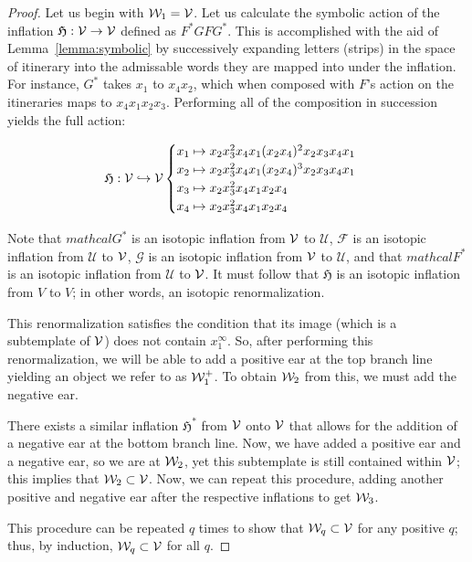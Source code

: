 \documentclass[paper.tex]{subfiles}
\begin{document}
\begin{proof}
Let us begin with $\mathcal{W}_1 = \mathcal{V}$. Let us calculate the symbolic action of the inflation $\mathfrak{H}: \mathcal{V} \to \mathcal{V}$ defined as $F^* G F G^*$. This is accomplished with the aid of Lemma~\ref{lemma:symbolic} by successively expanding
letters (strips) in the space of itinerary into the admissable words they are mapped into under the inflation.
For instance, $G^\ast$ takes $x_1$ to $x_4 x_2$, which when composed with $F$'s action on the itineraries maps to $x_4 x_1 x_2 x_3$. Performing all of the composition in succession yields the full action:

    $$\mathfrak{H}: \mathcal{V} \hookrightarrow \mathcal{V} \begin{cases}
        x_1 \mapsto x_2 x_3^2 x_4 x_1 (x_2 x_4)^2 x_2 x_3 x_4 x_1 \\
        x_2 \mapsto x_2 x_3^2 x_4 x_1 (x_2 x_4)^3 x_2 x_3 x_4 x_1 \\
        x_3 \mapsto x_2 x_3^2 x_4 x_1  x_2 x_4  \\
        x_4 \mapsto x_2 x_3^2 x_4 x_1  x_2 x_4  \end{cases} $$

        Note that $mathcal{G}^*$ is an isotopic inflation from $\mathcal{V}$ to $\mathcal{U}$, $\mathcal{F}$ is an isotopic inflation from $\mathcal{U}$ to $\mathcal{V}$, $\mathcal{G}$ is an isotopic inflation from $\mathcal{V}$ to $\mathcal{U}$, and that $mathcal{F}^*$ is an isotopic inflation from $\mathcal{U}$ to $\mathcal{V}$. It must follow that $\mathfrak{H}$ is an isotopic inflation from $V$ to $V$; in other words, an isotopic renormalization.

        This renormalization satisfies the condition that its image (which is a subtemplate of $\mathcal{V}$) does not contain $x_1^\infty$. So, after performing this renormalization, we will be able to add a positive ear at the top branch line
        yielding an object we refer to as $\mathcal{W}_1^+$. To obtain $\mathcal{W}_2$ from this, we must add the negative ear.

        There exists a similar inflation $\mathfrak{H}^*$ from $\mathcal{V}$ onto $\mathcal{V}$ that allows for the addition of a negative ear at the bottom branch line. Now, we have added a positive ear and a negative ear, so we are at $\mathcal{W}_2$, yet this subtemplate is still contained within $\mathcal{V}$; this implies that $\mathcal{W}_2 \subset \mathcal{V}$. Now, we can repeat this procedure, adding another positive and negative ear after the respective inflations to get $\mathcal{W}_3$.

        This procedure can be repeated $q$ times to show that $\mathcal{W}_q \subset \mathcal{V}$ for any positive $q$; thus, by induction, $\mathcal{W}_q \subset \mathcal{V}$ for all $q$.
    \end{proof}
\end{document}
